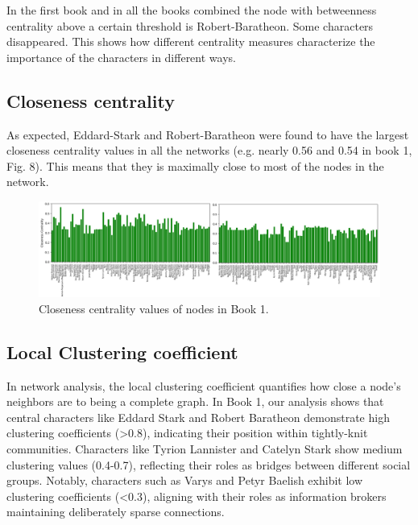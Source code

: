 \documentclass[12pt, a4paper]{article}
\begin{document}
In the first book and in all the books combined the node with betweenness centrality above a certain threshold is Robert-Baratheon. Some characters disappeared. This shows how different centrality measures characterize the importance of the characters in different ways.

\subsection{Closeness centrality}
\label{closeness centrality}
As expected, Eddard-Stark and Robert-Baratheon were found to have the largest closeness centrality values in all the networks (e.g. nearly 0.56 and 0.54 in book 1, Fig. 8). This means that they is maximally close to most of the nodes in the network.

\begin{figure}[H]
    \centering
    \includegraphics[width=1\linewidth]{Closeness centrality values of nodes in book 1..png}
    \caption{Closeness centrality values of nodes in Book 1.}
    \label{fig:enter-label}
\end{figure}
\subsection{Local Clustering coefficient}
In network analysis, the local clustering coefficient quantifies how close a node's neighbors are to being a complete graph. In Book 1, our analysis shows that central characters like Eddard Stark and Robert Baratheon demonstrate high clustering coefficients (>0.8), indicating their position within tightly-knit communities. Characters like Tyrion Lannister and Catelyn Stark show medium clustering values (0.4-0.7), reflecting their roles as bridges between different social groups. Notably, characters such as Varys and Petyr Baelish exhibit low clustering coefficients (<0.3), aligning with their roles as information brokers maintaining deliberately sparse connections.
\end{document}
